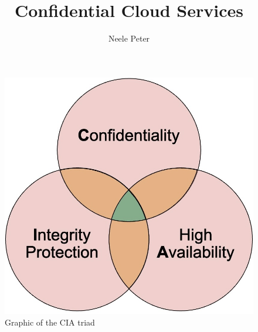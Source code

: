 \documentclass[sigconf]{acmart}
\title{Confidential Cloud Services}
\author{Neele Peter}
\affiliation{%
  \institution{Friedrich-Alexander-Universit\"at Erlangen-N\"urnberg}
  \country{}}
\begin{document}
	
	
\maketitle



\begin{figure}[h]
	\includegraphics[scale=0.25]{pictures/cia_triad}
	\caption{Graphic of the CIA triad}
	\label{cia}
\end{figure}

	






\newpage	



\newpage



\newpage



\newpage


	
\end{document}
